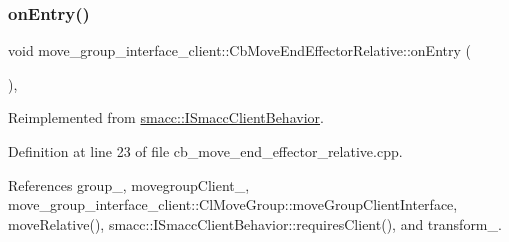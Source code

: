 \mbox{\label{classmove__group__interface__client_1_1CbMoveEndEffectorRelative_a54ba18388e200b43fda82a5f438d677e}} 
\subsubsection{\texorpdfstring{on\+Entry()}{onEntry()}}
{\footnotesize\ttfamily void move\+\_\+group\+\_\+interface\+\_\+client\+::\+Cb\+Move\+End\+Effector\+Relative\+::on\+Entry (\begin{DoxyParamCaption}{ }\end{DoxyParamCaption})\hspace{0.3cm}{\ttfamily [override]}, {\ttfamily [virtual]}}



Reimplemented from \hyperlink{classsmacc_1_1ISmaccClientBehavior_a3ec24a839087c550e1d62a81e48cf530}{smacc\+::\+I\+Smacc\+Client\+Behavior}.



Definition at line 23 of file cb\+\_\+move\+\_\+end\+\_\+effector\+\_\+relative.\+cpp.



References group\+\_\+, movegroup\+Client\+\_\+, move\+\_\+group\+\_\+interface\+\_\+client\+::\+Cl\+Move\+Group\+::move\+Group\+Client\+Interface, move\+Relative(), smacc\+::\+I\+Smacc\+Client\+Behavior\+::requires\+Client(), and transform\+\_\+.


